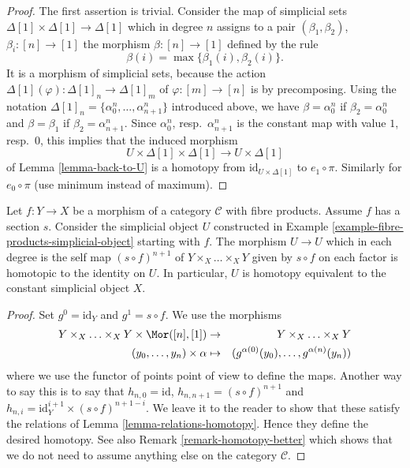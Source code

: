 \begin{proof}
The first assertion is trivial. Consider the map of simplicial sets
$\Delta[1] \times \Delta[1] \longrightarrow \Delta[1]$
which in degree $n$ assigns to a pair $(\beta_1, \beta_2)$,
$\beta_i : [n] \to [1]$ the morphism
$\beta : [n] \to [1]$ defined by the rule
$$
\beta(i) = \max\{\beta_1(i), \beta_2(i)\}.
$$
It is a morphism of simplicial sets, because the action
$\Delta[1](\varphi) : \Delta[1]_n \to \Delta[1]_m$
of $\varphi : [m] \to [n]$ is by precomposing.
Using the notation $\Delta[1]_n = \{\alpha^n_0, \ldots, \alpha^n_{n + 1}\}$
introduced above, we have $\beta = \alpha^n_0$ if $\beta_2 = \alpha^n_0$
and $\beta = \beta_1$ if $\beta_2 = \alpha^n_{n + 1}$.
Since $\alpha^n_0$, resp.\ $\alpha^n_{n + 1}$ is the constant map
with value $1$, resp.\ $0$, this implies that the induced morphism
$$
U \times \Delta[1] \times \Delta[1]
\longrightarrow
U \times \Delta[1]
$$
of Lemma \ref{lemma-back-to-U}
is a homotopy from $\text{id}_{U \times \Delta[1]}$ to $e_1 \circ \pi$.
Similarly for $e_0 \circ \pi$ (use minimum instead of maximum).
\end{proof}

\begin{lemma}
\label{lemma-fibre-products-simplicial-object-w-section}
Let $f : Y \to X$ be a morphism of a category $\mathcal{C}$ with
fibre products. Assume $f$ has a section $s$. Consider the
simplicial object $U$ constructed in
Example \ref{example-fibre-products-simplicial-object}
starting with $f$. The morphism $U \to U$ which in each degree
is the self map $(s \circ f)^{n + 1}$ of $Y \times_X \ldots \times_X Y$
given by $s \circ f$ on each factor is homotopic to the identity on $U$.
In particular, $U$ is homotopy equivalent to the constant
simplicial object $X$.
\end{lemma}

\begin{proof}
Set $g^0 = \text{id}_Y$ and $g^1 = s \circ f$.
We use the morphisms
\begin{eqnarray*}
Y \times_X \ldots \times_X Y \times \Mor([n], [1])
& \to &
Y \times_X \ldots \times_X Y \\
(y_0, \ldots, y_n) \times \alpha
& \mapsto &
(g^{\alpha(0)}(y_0), \ldots, g^{\alpha(n)}(y_n))
\end{eqnarray*}
where we use the functor of points point of view to define the maps.
Another way to say this is to say that
$h_{n, 0} = \text{id}$, $h_{n, n + 1} = (s \circ f)^{n + 1}$ and
$h_{n, i} = \text{id}_Y^{i + 1} \times (s \circ f)^{n + 1 - i}$.
We leave it to the reader to show that these satisfy the relations
of Lemma \ref{lemma-relations-homotopy}. Hence they define
the desired homotopy. See also Remark \ref{remark-homotopy-better}
which shows that
we do not need to assume anything else on the category $\mathcal{C}$.
\end{proof}

